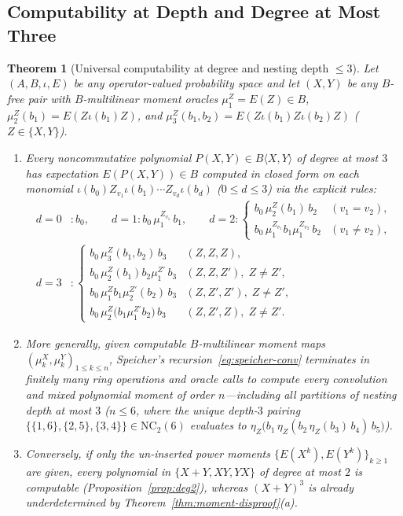 \documentclass[11pt,a4paper]{article}
\newtheorem{theorem}{Theorem}[section]
\theoremstyle{definition}
\newcommand{\NC}{\mathrm{NC}}
\begin{document}
\subsection{Computability at Depth and Degree at Most Three}
\begin{theorem}[Universal computability at degree and nesting depth $\le 3$]\label{thm:deg3-comp}
Let $(A, B, \iota, E)$ be \emph{any} operator-valued probability space and let $(X, Y)$ be \emph{any} $B$-free pair with $B$-multilinear moment oracles $\mu_1^Z = E(Z) \in B$, $\mu_2^Z(b_1) = E(Z \iota(b_1) Z)$, and $\mu_3^Z(b_1, b_2) = E(Z \iota(b_1) Z \iota(b_2) Z)$ ($Z \in \{X, Y\}$).
\begin{enumerate}
\item[(a)] Every noncommutative polynomial $P(X, Y) \in B\langle X, Y \rangle$ of degree at most $3$ has expectation $E(P(X, Y)) \in B$ computed in closed form on each monomial $\iota(b_0) Z_{v_1} \iota(b_1) \cdots Z_{v_d} \iota(b_d)$ ($0 \le d \le 3$) via the explicit rules:
\begin{align*}
d = 0 &: b_0, \qquad
d = 1 : b_0\, \mu_1^{Z_{v_1}}\, b_1, \qquad
d = 2 : \begin{cases}
b_0\, \mu_2^Z(b_1)\, b_2 & (v_1 = v_2),\\
b_0\, \mu_1^{Z_{v_1}} b_1 \mu_1^{Z_{v_2}}\, b_2 & (v_1 \neq v_2),
\end{cases}\\
d = 3 &: \begin{cases}
b_0\, \mu_3^Z(b_1, b_2)\, b_3 & (Z, Z, Z),\\
b_0\, \mu_2^{Z}(b_1) b_2 \mu_1^{Z'}\, b_3 & (Z, Z, Z'),\; Z \neq Z',\\
b_0\, \mu_1^{Z} b_1 \mu_2^{Z'}(b_2)\, b_3 & (Z, Z', Z'),\; Z \neq Z',\\
b_0\, \mu_2^{Z}\bigl(b_1 \mu_1^{Z'} b_2\bigr)\, b_3 & (Z, Z', Z),\; Z \neq Z'.
\end{cases}
\end{align*}
\item[(b)] More generally, given computable $B$-multilinear moment maps $(\mu_k^X, \mu_k^Y)_{1 \le k \le n}$, Speicher's recursion~\eqref{eq:speicher-conv} terminates in finitely many ring operations and oracle calls to compute every convolution and mixed polynomial moment of order $n$---including all partitions of nesting depth at most $3$ ($n \le 6$, where the unique depth-$3$ pairing $\{\{1,6\},\{2,5\},\{3,4\}\} \in \NC_2(6)$ evaluates to $\eta_Z\bigl(b_1\, \eta_Z(b_2\, \eta_Z(b_3)\, b_4)\, b_5\bigr)$).
\item[(c)] Conversely, if only the un-inserted power moments $\{E(X^k), E(Y^k)\}_{k \ge 1}$ are given, every polynomial in $\{X + Y, XY, YX\}$ of degree at most $2$ is computable (Proposition~\ref{prop:deg2}), whereas $(X + Y)^3$ is already underdetermined by Theorem~\ref{thm:moment-disproof}(a).
\end{enumerate}
\end{theorem}
\end{document}
